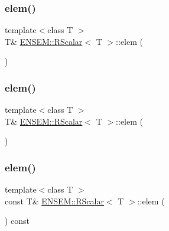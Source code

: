 \subsubsection{\texorpdfstring{elem()}{elem()}\hspace{0.1cm}{\footnotesize\ttfamily [2/6]}}
{\footnotesize\ttfamily template$<$class T $>$ \\
T\& \mbox{\hyperlink{classENSEM_1_1RScalar}{E\+N\+S\+E\+M\+::\+R\+Scalar}}$<$ T $>$\+::elem (\begin{DoxyParamCaption}{ }\end{DoxyParamCaption})\hspace{0.3cm}{\ttfamily [inline]}}

\mbox{\label{classENSEM_1_1RScalar_ac1e3c3dba2379fdcea237f7c2bbb1e0e}} 
\subsubsection{\texorpdfstring{elem()}{elem()}\hspace{0.1cm}{\footnotesize\ttfamily [3/6]}}
{\footnotesize\ttfamily template$<$class T $>$ \\
T\& \mbox{\hyperlink{classENSEM_1_1RScalar}{E\+N\+S\+E\+M\+::\+R\+Scalar}}$<$ T $>$\+::elem (\begin{DoxyParamCaption}{ }\end{DoxyParamCaption})\hspace{0.3cm}{\ttfamily [inline]}}

\mbox{\label{classENSEM_1_1RScalar_a26bfcd896407f15877920b5f737119fe}} 
\subsubsection{\texorpdfstring{elem()}{elem()}\hspace{0.1cm}{\footnotesize\ttfamily [4/6]}}
{\footnotesize\ttfamily template$<$class T $>$ \\
const T\& \mbox{\hyperlink{classENSEM_1_1RScalar}{E\+N\+S\+E\+M\+::\+R\+Scalar}}$<$ T $>$\+::elem (\begin{DoxyParamCaption}{ }\end{DoxyParamCaption}) const\hspace{0.3cm}{\ttfamily [inline]}}

